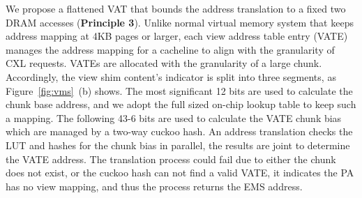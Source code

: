 

We propose a flattened VAT that bounds the address translation to a fixed two DRAM accesses (\textbf{Principle 3}). Unlike normal virtual memory system that keeps address mapping at 4KB pages or larger, each view address table entry (VATE) manages the address mapping for a cacheline to align with the granularity of CXL requests. VATEs are allocated with the granularity of a large chunk. 
Accordingly, the view shim content's indicator is split into three segments, as Figure~\ref{fig:vms}~(b) shows. The most significant 12 bits are used to calculate the chunk base address, and we adopt the full sized on-chip lookup table to keep such a mapping. The following 43-6 bits are used to calculate the VATE chunk bias which are managed by a two-way cuckoo hash. An address translation checks the LUT and hashes for the chunk bias in parallel, the results are joint to determine the VATE address. The translation process could fail due to either the chunk does not exist, or the cuckoo hash can not find a valid VATE, it indicates the PA has no view mapping, and thus the process returns the EMS address. 



